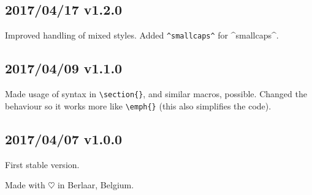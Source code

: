 \documentclass[a4paper, 11pt]{article}
\begin{document}
	\subsection*{2017/04/17 v1.2.0}
	Improved handling of mixed styles.
	Added \verb|^smallcaps^| for ^smallcaps^.

	\subsection*{2017/04/09 v1.1.0}
	Made usage of syntax in \verb|\section{}|, and similar macros, possible. Changed the behaviour so it works more like \verb|\emph{}| (this also simplifies the code).

	\subsection*{2017/04/07 v1.0.0}
	First stable version.

	\vspace*{\fill}\noindent
	Made with $\heartsuit$ in Berlaar, Belgium.
	\clearpage
\end{document}
